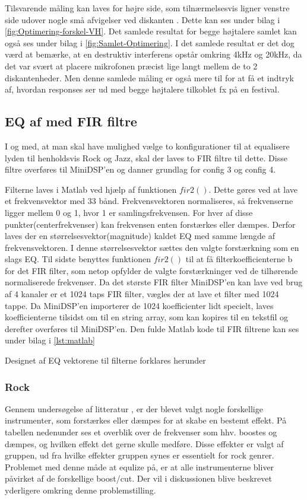 Tilsvarende måling kan laves for højre side, som tilnærmelsesvis ligner venstre side udover nogle små afvigelser ved diskanten . Dette kan ses under bilag i \autoref{fig:Optimering-forskel-VH}. Det samlede resultat for begge højtalere samlet kan også ses under bilag i \autoref{fig:Samlet-Optimering}. I det samlede resultat er det dog værd at bemærke, at en destruktiv interferens opstår omkring 4kHz og 20kHz, da det var svært at placere mikrofonen præcist lige langt mellem de to 2 diskantenheder. Men denne samlede måling er også mere til for at få et indtryk af, hvordan responses ser ud med begge højtalere tilkoblet fx på en festival.

\subsection{EQ af med FIR filtre}
I og med, at man skal have mulighed vælge to konfigurationer til at equalisere lyden til henholdsvis Rock og Jazz, skal der laves to FIR filtre til dette. Disse filtre overføres til MiniDSP'en og danner grundlag for config 3 og config 4.

Filterne laves i Matlab ved hjælp af funktionen $fir2()$. Dette gøres ved at lave et frekvensvektor med 33 bånd. Frekvensvektoren normaliseres, så frekvenserne ligger mellem 0 og 1, hvor 1 er samlingsfrekvensen. For hver af disse punkter(centerfrekvenser) kan frekvensen enten forstærkes eller dæmpes. Derfor laves der en størrelsesvektor(magnitude) kaldet EQ med samme længde af frekvensvektoren. I denne størrelsesvektor sættes den valgte forstærkning som en slags EQ. Til sidste benyttes funktionen $fir2()$ til at få filterkoefficienterne b for det FIR filter, som netop opfylder de valgte forstærkninger ved de tilhørende normaliserede frekvenser. Da det største FIR filter MiniDSP'en kan lave ved brug af 4 kanaler er et 1024 taps FIR filter, vægles der at lave et filter med 1024 tappe. Da MiniDSP'en importerer de 1024 koefficienter lidt specielt, laves koefficienterne tilsidst om til en string array, som kan kopires til en tekstfil og derefter overføres til MiniDSP'en. Den fulde Matlab kode til FIR filtrene kan ses under bilag i \autoref{lst:matlab}
  

Designet af EQ vektorene til filterne forklares herunder


\subsubsection{Rock}
Gennem undersøgelse af litteratur \cite[chapter 12]{HomeStudio}, er der blevet valgt nogle forskellige instrumenter, som forstærkes eller dæmpes for at skabe en bestemt effekt. På tabellen nedenunder ses et overblik over de frekvenser som hhv. boostes og dæmpes, og hvilken effekt det  gerne skulle medføre. Disse effekter er valgt af gruppen, ud fra hvilke effekter gruppen synes er essentielt for rock genrer. Problemet med denne måde at equlize på, er at alle instrumenterne bliver påvirket af de forskellige boost/cut. Der vil i diskussionen blive beskrevet yderligere omkring denne problemstilling. 

